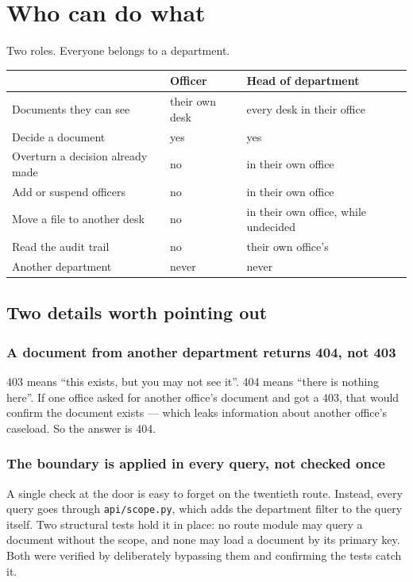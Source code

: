 \documentclass[11pt,a4paper]{article}
\begin{document}
\newpage

\section{Who can do what}

Two roles. Everyone belongs to a department.

\begin{longtable}{@{}p{6.4cm}p{3.8cm}p{4cm}@{}}
\toprule
 & \textbf{Officer} & \textbf{Head of department} \\
\midrule
\endhead
Documents they can see & their own desk & every desk in their office \\
Decide a document & yes & yes \\
Overturn a decision already made & no & in their own office \\
Add or suspend officers & no & in their own office \\
Move a file to another desk & no & in their own office, while undecided \\
Read the audit trail & no & their own office's \\
Another department & never & never \\
\bottomrule
\end{longtable}

\subsection{Two details worth pointing out}

\subsubsection*{A document from another department returns 404, not 403}

403 means ``this exists, but you may not see it''. 404 means ``there is nothing
here''. If one office asked for another office's document and got a 403, that
would confirm the document exists --- which leaks information about another
office's caseload. So the answer is 404.

\subsubsection*{The boundary is applied in every query, not checked once}

A single check at the door is easy to forget on the twentieth route. Instead,
every query goes through \texttt{api/scope.py}, which adds the department filter
to the query itself. Two structural tests hold it in place: no route module may
query a document without the scope, and none may load a document by its primary
key. Both were verified by deliberately bypassing them and confirming the tests
catch it.
\end{document}
